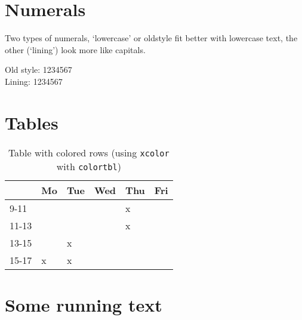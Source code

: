 \documentclass[draft=false]{book}
\begin{document}

\section{Numerals}
Two types of numerals, `lowercase' or oldstyle fit better with lowercase text, the other (`lining') look more like capitals.

Old style: 1234567\\
Lining: 1234567

\section{Tables}

\begin{table}[ht]
	\renewcommand{\arraystretch}{1.2}
\begin{center}
	\begin{tabular}{llllll}
		& Mo & Tue & Wed & Thu & Fri \\
		\hline
		9-11 & & & & x & \\
		11-13 & & & & x & \\
		13-15 & & x & & & \\
		15-17 & x & x & & & \\
		\end{tabular}
	\end{center}
	\label{tab:sched}
	\caption{Table with colored rows (using \texttt{xcolor} with \texttt{colortbl})}
\end{table}

\section{Some running text}
\end{document}
